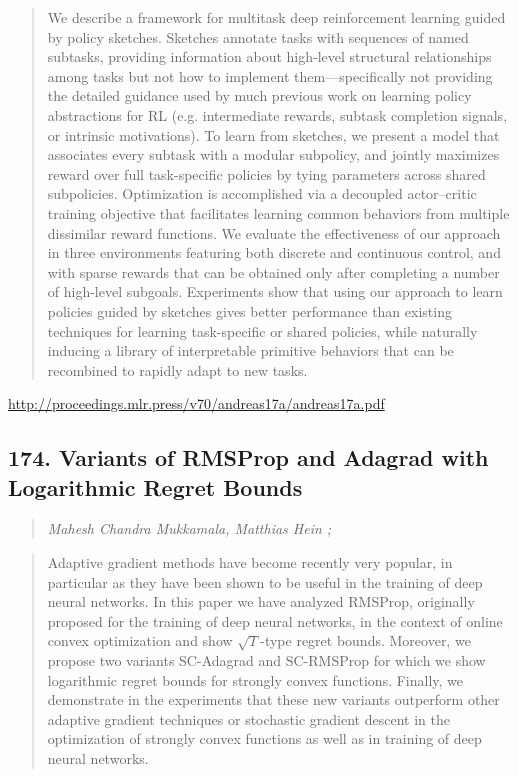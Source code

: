 \documentclass{article}
\begin{document}
\begin{quote}
    We describe a framework for multitask deep reinforcement learning guided by policy sketches. Sketches annotate tasks with sequences of named subtasks, providing information about high-level structural relationships among tasks but not how to implement them—specifically not providing the detailed guidance used by much previous work on learning policy abstractions for RL (e.g. intermediate rewards, subtask completion signals, or intrinsic motivations). To learn from sketches, we present a model that associates every subtask with a modular subpolicy, and jointly maximizes reward over full task-specific policies by tying parameters across shared subpolicies. Optimization is accomplished via a decoupled actor–critic training objective that facilitates learning common behaviors from multiple dissimilar reward functions. We evaluate the effectiveness of our approach in three environments featuring both discrete and continuous control, and with sparse rewards that can be obtained only after completing a number of high-level subgoals. Experiments show that using our approach to learn policies guided by sketches gives better performance than existing techniques for learning task-specific or shared policies, while naturally inducing a library of interpretable primitive behaviors that can be recombined to rapidly adapt to new tasks.  \end{quote}

\href{http://proceedings.mlr.press/v70/andreas17a/andreas17a.pdf}{http://proceedings.mlr.press/v70/andreas17a/andreas17a.pdf}

\subsection{174. Variants of RMSProp and Adagrad with Logarithmic Regret Bounds}

\begin{quote}
\footnotesize{\textit{Mahesh Chandra Mukkamala, Matthias Hein ;}}
\end{quote}

\begin{quote}
    Adaptive gradient methods have become recently very popular, in particular as they have been shown to be useful in the training of deep neural networks. In this paper we have analyzed RMSProp, originally proposed for the training of deep neural networks, in the context of online convex optimization and show $\sqrt{T}$-type regret bounds. Moreover, we propose two variants SC-Adagrad and SC-RMSProp for which we show logarithmic regret bounds for strongly convex functions. Finally, we demonstrate in the experiments that these new variants outperform other adaptive gradient techniques or stochastic gradient descent in the optimization of strongly convex functions as well as in training of deep neural networks.  \end{quote}
\end{document}
